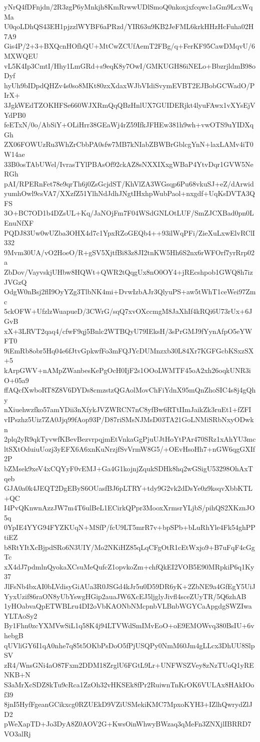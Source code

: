 yNrQ4fDFnjdn/2R3zgP6yMnkjh8KmRrwwUDlSmoQ0nkoxjxfcqwc1aGm9LcxWqMa
U0qoLDhQS43EH1pjzzlWYBF6aPRzd/YIR63u9KB2JeFML6krkHHzHcFuha02H7A9
Gis4P/2+3+BXQcnHOfhQU+MtCwZCUfAemT2FBg/q+FerKF95CawDMqvU/6MXWQEU
vL5K4Ip3CmtI/Hhy1LmGRd+s9eqK8y7OwI/GMKUGH86iNELo+BbzrjldmB98oDyf
hyUh9bIDpdQHZv4s0so8MKt80zxXdaxWJbVIdiSvymEVBT2EJBobGCWadO/PIrX+
3JgkWEdTZOKHFSe660WJXRmQqQBzHnlUX7GUIDERjkt4lyuFAwx1vXYsEjVYdPB0
feETxN/0o/AbSiY+OLiHrr38GEaWj4rZ59IfkJFHEw381h9wh+vwOTS9uYIDXqGh
ZX06FOWUzRu3WhZrCbbPA0sfw7MB7kNIabZBWBrGblcgYnN+laxLAMv4iT0W14ae
33B0osTAbUWel/IvrasTYlPBAsOf92ckAZ8sNXXIXxgWBaP4YtvDqr1GVW5NeRGh
pAI/RPERnFet78e9qrTh6j0ZsGcjdST/KhVlZA3WGsqp6Pu68vkuSJ+eZ/dArwid
yumhOwl9csVA7/XXzfZ51YlhNdJdhJNgtIHxhpWubPaol+nxgdf+UqKsDVTA3QFS
3O+BC7OD1b4DZsUL+Kq/JaNOjFm7F04WSdGNLOtLUF/SmZJCXBad0pn0LEnuNfXF
PQDJ83Uw0wUZba3OHX4d7c1YpxRZoGEQb4++93ilWqPFi/ZieXuLxwElvRClI332
9Mvm30UA/vO2HoeO/R+gSV5XjtfBi83z8JI2tnKW5Hh6S2nx6rWFOrf7yrRrp02a
ZbDov/VayvskjUHbw8HQWt+QWR2tQqgUx8nO0OY4+jREcshpob1GWQ8h7izJVGzQ
OdgW0nBsj2flI9OyYZg3TlbNK4mi+DvwIzbAJr3QlyuPS+aw5tWhT1ceWei97Zmc
5ckOFW+UfzlzWuapueD/3CWrG/sqQ7xvOXccmgM8JaXhIf4kRQi6U73rUx+6JGvB
xX+3LRVT2qaq4/cfwF9qj5Bnlc2WTBQyU79IEksH/3sPrGMJ9fYynAfpO5eYWFT0
9iEmRb8obr5Hq04e6fJtvGpkwfFo3mFQJYcDUMnzxb30L84Xr7KGFGcbKSxzSX+5
kArpGWV+nAMpZWanbesKePgOcH0IjF2s1OOoLWMTF45oA2xh26oqkUNR3iO+05a9
ffAQcfXwboRT8Z8V6DYDs8cmzstzQGAolMovChFiYdnX95mQnZhoSIC4s8j4gQhy
nXiuehwzfko57amYDii3nXfykJVZWRCN7nC8yfBw6RTtIImJaikZk3ruEt1+fZFI
vIPszhz5Uiz7ZA0Jjq99fAop93P/D87riSMsNJMsD03TA21GoLNMiSRbNxyODwkn
2plq2yR9qkTyvwfKBevBezvrpqjmEtVnkaGgPjuUJtHoYtPAr470SRz1xAhYU3mc
ltSXtOduiuUozj3yEFX6A6xnKuNrzjfSvVrmW8G5/+OEvHsoHh7+nGW6qgGXIf2P
bZMsek9xeV4xCQYyF0vEMJ+Ga4G1kojnjZqukSDHk8hq2wGSigU53298OhAxTqeb
GJA0a0k4JEQT2DgEByS6OUasfBJ6pLTRY+tdy9G2vk2dDsYe0z9ksqvXbbKTL+QC
I4PvQKnwnAzzJW7m4T6ulBeL1ECirkQPpr3MooxXrmsrYLjbS/pihQS2XKznJO5q
0YpIE4YYG94FYZKUqN+MSfP/fcU9LT5mrR7v+bpSPb+bLuRhYle4Fk54ghPPtiEZ
b8RtYItXcBjpdSRo6N3UIY/Mo2NKiHZ85qLqCFgOtR1cEtWxjo9+B7uFqF4cGgTc
xX4dJ7pdmlnQyokaXCsuMeQufcZ1opvkoZm+chfQkEI2VOB5E90MRpkiP6q1Ky37
JlFsNb4bxAI0bLVdisyGiAUa3R0JSGd4kJr5u0D59DR6yK+2ZbNE9a4GfEgY5UiJ
YyxUzif86raON8yUbYswgHGip2auaJW6XcEJ5ljglyJivfl4sceZUyTR/5Q6zhAB
1yHOabvaQpETWBLru4DI2oVbKAONbNMcpnbVLBnbWGYCaApgdgSWZIwaYLTAoSy2
By1Fhn0zcYXMVwSiL1q58K4j94LTVWdSmIMvEoO+oE9EMOWvq380BsIU+6vhebgB
qUVliGY6I1qA0nhe7q85t5OKbPsDoO5fPjUSQPy0NmM60Jm4gLLcx3DhUU8SlpSV
zR4/WnsGNi4aO87Fxm2DDM18ZrglU6FGtL9Lr+UNFWSZVey8zNzTUoQ1yRENKB+N
S3aMrXcSDZ8kTu9cRca1ZzOh32vHKSEk8fPr2RuiwnTnKrOK6VULAx8HAkIOof39
8jnI5HyfFgeanGCikxcg0RZUEkD9VZiUSMekiKMC7MpxoKYH3+IZlhQwrydZlJD2
pWeXapTD+Jo3DyA8Z0AOV2G+KwsOinWhwyBWzaq3qMeFn3ZNXjlIBRRD7VO3alRj
